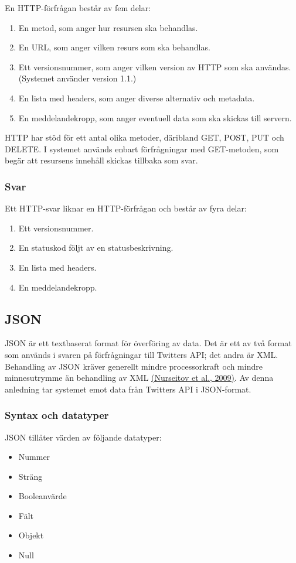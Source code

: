\documentclass[a4paper,11pt]{article}
\begin{document}
En HTTP-förfrågan består av fem delar:
	
	\begin{enumerate}
    	\item En metod, som anger hur resursen ska behandlas.
    	\item En URL, som anger vilken resurs som ska behandlas.
    	\item Ett versionsnummer, som anger vilken version av HTTP som ska användas. (Systemet använder version 1.1.)
    	\item En lista med headers, som anger diverse alternativ och metadata.
    	\item En meddelandekropp, som anger eventuell data som ska skickas till servern.
	\end{enumerate}

HTTP har stöd för ett antal olika metoder, däribland GET, POST, PUT och DELETE. I systemet används enbart förfrågningar med GET-metoden, som begär att resursens innehåll skickas tillbaka som svar.
	
\subsubsection{Svar}
	
Ett HTTP-svar liknar en HTTP-förfrågan och består av fyra delar:

	\begin{enumerate}
    	\item Ett versionsnummer.
    	\item En statuskod följt av en statusbeskrivning.
    	\item En lista med headers.
    	\item En meddelandekropp.
    	\end{enumerate}

\subsection{JSON}
\label{sec:json}
JSON är ett textbaserat format för överföring av data. Det är ett av två format som används i svaren på förfrågningar till Twitters API; det andra är XML. Behandling av JSON kräver generellt mindre processorkraft och mindre minnesutrymme än behandling av XML \hyperref[paulson]{(Nurseitov et al., 2009)}. Av denna anledning tar systemet emot data från Twitters API i JSON-format.

\subsubsection{Syntax och datatyper}
JSON tillåter värden av följande datatyper:
	\begin{itemize}
	\item Nummer
    	\item Sträng
    	\item Booleanvärde
    	\item Fält
    	\item Objekt
    	\item Null
	\end{itemize}
\end{document}
